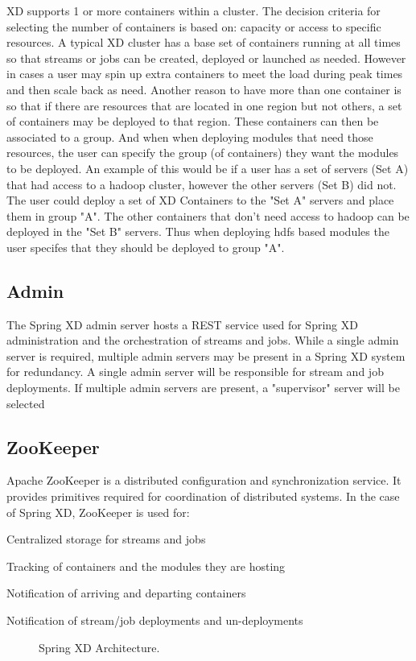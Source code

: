 XD supports 1 or more containers within a cluster. The decision criteria
for selecting the number of containers is based on: capacity or access to specific 
resources.  A typical XD cluster has a base set of containers running at all times 
so that streams or jobs can be created, deployed or launched as needed.  However in cases 
a user may spin up extra containers to meet the load during peak times and then scale back 
as need.  Another reason to have more than one container is so that if there are 
resources that are located in one region but not others, a set of containers may be 
deployed to that region.  These containers can then be associated to a group.  And when
when deploying modules that need those resources, the user can specify the group 
(of containers) they want the modules to be deployed.  
An example of this would be if a user has a set of servers (Set A) that had access to a 
hadoop cluster, however the other servers (Set B) did not.  The user could deploy a set of 
XD Containers to the "Set A" servers and place them in group "A".  The other containers
that don't need access to hadoop can be deployed in the "Set B" servers.  Thus when 
deploying hdfs based modules the user specifes that they should be deployed to group "A".

\subsection{Admin}
The Spring XD admin server hosts a REST service used for Spring XD
administration and the orchestration of streams and jobs. While a single
admin server is required, multiple admin servers may be present in a Spring XD
system for redundancy. A single admin server will be responsible for stream
and job deployments. If multiple admin servers are present, a "supervisor"
server will be selected 

\subsection{ZooKeeper}
Apache ZooKeeper is a distributed configuration and synchronization service.
It provides primitives required for coordination of distributed systems.
In the case of Spring XD, ZooKeeper is used for: \begin{itemize*}
	\item Centralized storage for streams and jobs
	\item Tracking of containers and the modules they are hosting
	\item Notification of arriving and departing containers
	\item Notification of stream/job deployments and un-deployments
\end{itemize*}
\begin{figure}[ht]
\centering
{}
\caption{Spring XD Architecture.}
\label{fig:architecture}
\end{figure}

